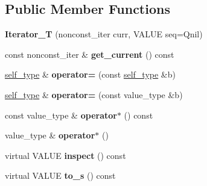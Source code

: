 \subsection*{Public Member Functions}
\begin{DoxyCompactItemize}
\item 
{\bfseries Iterator\+\_\+T} (nonconst\+\_\+iter curr, V\+A\+L\+UE seq=Qnil)\hypertarget{classswig_1_1Iterator__T_ad5682e674b9de9002673b331af4f4178}{}\label{classswig_1_1Iterator__T_ad5682e674b9de9002673b331af4f4178}

\item 
const nonconst\+\_\+iter \& {\bfseries get\+\_\+current} () const \hypertarget{classswig_1_1Iterator__T_a14a7aa134487f46ef622d14a8b9ccc99}{}\label{classswig_1_1Iterator__T_a14a7aa134487f46ef622d14a8b9ccc99}

\item 
\hyperlink{structswig_1_1ConstIterator}{self\+\_\+type} \& {\bfseries operator=} (const \hyperlink{structswig_1_1ConstIterator}{self\+\_\+type} \&b)\hypertarget{classswig_1_1Iterator__T_a09655fafdb3e42268373398cac042583}{}\label{classswig_1_1Iterator__T_a09655fafdb3e42268373398cac042583}

\item 
\hyperlink{structswig_1_1ConstIterator}{self\+\_\+type} \& {\bfseries operator=} (const value\+\_\+type \&b)\hypertarget{classswig_1_1Iterator__T_ad4bd92e8c7c017dc8bc4b79bb5c61c78}{}\label{classswig_1_1Iterator__T_ad4bd92e8c7c017dc8bc4b79bb5c61c78}

\item 
const value\+\_\+type \& {\bfseries operator$\ast$} () const \hypertarget{classswig_1_1Iterator__T_a2024b56ae7094b1a59fc1db0c1862075}{}\label{classswig_1_1Iterator__T_a2024b56ae7094b1a59fc1db0c1862075}

\item 
value\+\_\+type \& {\bfseries operator$\ast$} ()\hypertarget{classswig_1_1Iterator__T_a70d69a1a0a6319dd2fc7b3b1af748cc9}{}\label{classswig_1_1Iterator__T_a70d69a1a0a6319dd2fc7b3b1af748cc9}

\item 
virtual V\+A\+L\+UE {\bfseries inspect} () const \hypertarget{classswig_1_1Iterator__T_a9da8800c0afc61526557863680f55b30}{}\label{classswig_1_1Iterator__T_a9da8800c0afc61526557863680f55b30}

\item 
virtual V\+A\+L\+UE {\bfseries to\+\_\+s} () const \hypertarget{classswig_1_1Iterator__T_ac76f613bee1daca23d82cc8d0cbe411f}{}\label{classswig_1_1Iterator__T_ac76f613bee1daca23d82cc8d0cbe411f}

\end{DoxyCompactItemize}
